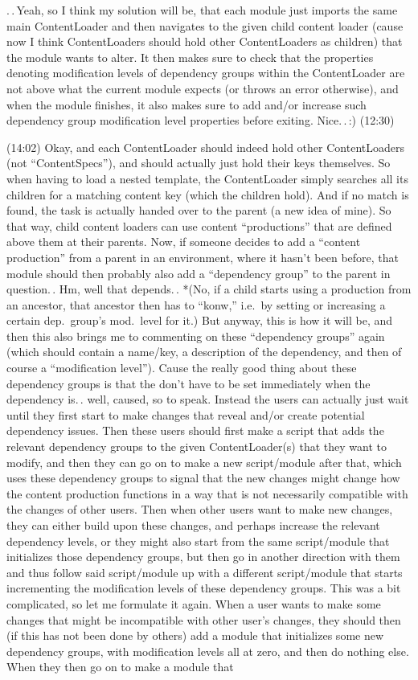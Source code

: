 \documentclass{report}
\begin{document}
.\,.\,Yeah, so I think my solution will be, that each module just imports the same main ContentLoader and then navigates to the given child content loader (cause now I think ContentLoaders should hold other ContentLoaders as children) that the module wants to alter. It then makes sure to check that the properties denoting modification levels of dependency groups within the ContentLoader are not above what the current module expects (or throws an error otherwise), and when the module finishes, it also makes sure to add and/or increase such dependency group modification level properties before exiting. Nice.\,.\,:) (12:30)

(14:02) Okay, and each ContentLoader should indeed hold other ContentLoaders (not ``ContentSpecs''), and should actually just hold their keys themselves. So when having to load a nested template, the ContentLoader simply searches all its children for a matching content key (which the children hold). And if no match is found, the task is actually handed over to the parent (a new idea of mine). So that way, child content loaders can use content ``productions'' that are defined above them at their parents. Now, if someone decides to add a ``content production'' from a parent in an environment, where it hasn't been before, that module should then probably also add a ``dependency group'' to the parent in question.\,. Hm, well that depends.\,. *(No, if a child starts using a production from an ancestor, that ancestor then has to ``konw,'' i.e.\ by setting or increasing a certain dep.\ group's mod.\ level for it.) But anyway, this is how it will be, and then this also brings me to commenting on these ``dependency groups'' again (which should contain a name/key, a description of the dependency, and then of course a ``modification level''). Cause the really good thing about these dependency groups is that the don't have to be set immediately when the dependency is.\,. well, caused, so to speak. Instead the users can actually just wait until they first start to make changes that reveal and/or create potential dependency issues. Then these users should first make a script that adds the relevant dependency groups to the given ContentLoader(s) that they want to modify, and then they can go on to make a new script/module after that, which uses these dependency groups to signal that the new changes might change how the content production functions in a way that is not necessarily compatible with the changes of other users. Then when other users want to make new changes, they can either build upon these changes, and perhaps increase the relevant dependency levels, or they might also start from the same script/module that initializes those dependency groups, but then go in another direction with them and thus follow said script/module up with a different script/module that starts incrementing the modification levels of these dependency groups. This was a bit complicated, so let me formulate it again. When a user wants to make some changes that might be incompatible with other user's changes, they should then (if this has not been done by others) add a module that initializes some new dependency groups, with modification levels all at zero, and then do nothing else. When they then go on to make a module that 
\end{document}
